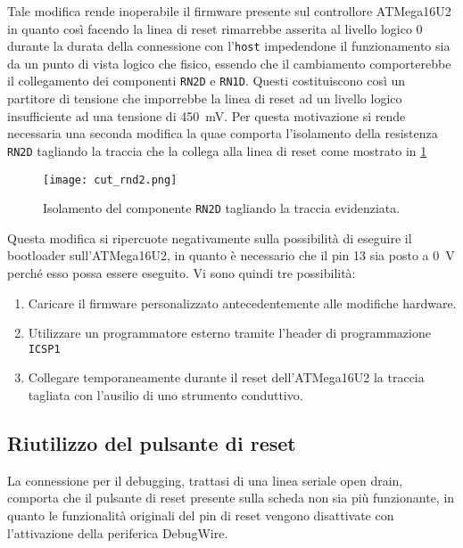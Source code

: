 Tale modifica rende inoperabile il firmware presente sul controllore ATMega16U2 in quanto così facendo la linea di reset rimarrebbe asserita al livello logico 0 durante la durata della connessione con l'\texttt{host} impedendone il funzionamento sia da un punto di vista logico che fisico, essendo che il cambiamento comporterebbe il collegamento dei componenti \texttt{RN2D} e \texttt{RN1D}. Questi costituiscono così un partitore di tensione che imporrebbe la linea di reset ad un livello logico insufficiente ad una tensione di \SI{450}{\milli\volt}. 
Per questa motivazione si rende necessaria una seconda modifica la quae comporta l'isolamento della resistenza \texttt{RN2D} tagliando la traccia che la collega alla linea di reset come mostrato in \cref{fig:cut-rnd2}

\begin{figure}[b]
    \centering
    \texttt{[image: cut\_rnd2.png]}
    \caption[]{Isolamento del componente \texttt{RN2D} tagliando la traccia evidenziata.}\label{fig:cut-rnd2}
\end{figure}

Questa modifica si ripercuote negativamente sulla possibilità di eseguire il bootloader sull'ATMega16U2, in quanto è necessario che il pin 13 sia posto a \SI{0}{\volt} perché esso possa essere eseguito\cite[sec 23.6.3]{avr:m16u2}. Vi sono quindi tre possibilità:
\begin{enumerate}
    \item Caricare il firmware personalizzato antecedentemente alle modifiche hardware.
    \item Utilizzare un programmatore esterno tramite l'header di programmazione \texttt{ICSP1}
    \item Collegare temporaneamente durante il reset dell'ATMega16U2 la traccia tagliata con l'ausilio di uno strumento conduttivo.
\end{enumerate} 

\subsection{Riutilizzo del pulsante di reset}

La connessione per il debugging, trattasi di una linea seriale open drain, comporta che il pulsante di reset presente sulla scheda non sia più funzionante, in quanto le funzionalità originali del pin di reset vengono disattivate con l'attivazione della periferica DebugWire.

